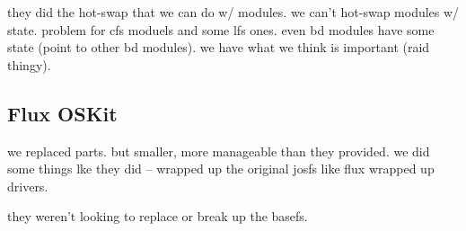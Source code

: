 they did the hot-swap that we can do w/ modules. we can't hot-swap
modules w/ state. problem for cfs moduels and some lfs ones. even bd
modules have some state (point to other bd modules). we have what we
think is important (raid thingy).

\subsection{Flux OSKit}

\cite{ford97oskit}
we replaced parts. but smaller, more manageable than they provided. we
did some things lke they did -- wrapped up the original josfs like
flux wrapped up drivers.

they weren't looking to replace or break up the basefs.
